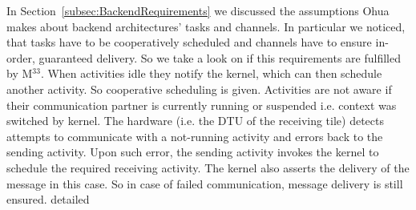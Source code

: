 In Section~\ref{subsec:BackendRequirements} we discussed the assumptions Ohua makes about backend architectures' tasks and channels. In particular we noticed, that tasks have to be cooperatively scheduled and channels have to ensure in-order, guaranteed delivery. So we take a look on if this requirements are fulfilled by M$^33$.
When activities idle they notify the kernel, which can then schedule another activity. So cooperative scheduling is given. Activities are not aware if their communication partner is currently running or suspended i.e. context was switched by kernel. The hardware (i.e. the DTU of the receiving tile) detects attempts to communicate with a not-running activity and errors back to the sending activity. Upon such error, the sending activity invokes the kernel to schedule the required receiving activity. The kernel also asserts the delivery of the message in this case. So in case of failed communication, message delivery is still ensured. 
detailed
